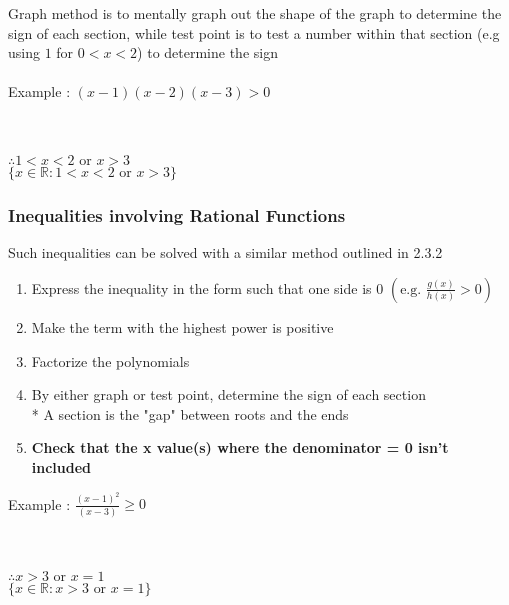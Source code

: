 \documentclass[../main.tex]{subfiles}
\begin{document}
Graph method is to mentally graph out the shape of the graph to
determine the sign of each section, while  test point is to test
a number within that section (e.g using \(1\) for \(0<x<2\)) to
determine the sign \\\\
Example : \((x-1)(x-2)(x-3)>0\) \\\\
 \\
\(\therefore 1<x<2 \text{ or } x>3\) \\
\(\{x \in \mathbb{R} : 1<x<2 \text{ or } x>3\}\)
\newpage \noindent

\subsubsection{Inequalities involving Rational Functions}
Such inequalities can be solved with a similar method outlined in 2.3.2
\begin{enumerate}
    \item Express the inequality in the form such that one side is 0 \(\left(\text{e.g. }\displaystyle \frac{g(x)}{h(x)}>0\right)\)
    \item Make the term with the highest power is positive
    \item Factorize the polynomials
    \item By either graph or test point, determine the sign of each section\\* A section is the "gap" between roots and the ends
    \item \textbf{Check that the  x value(s) where the denominator = 0 isn't included}
\end{enumerate}
Example : \(\displaystyle \frac{(x-1)^{2}}{(x-3)} \geq 0\) \\\\
 \\
\(\therefore x>3 \text{ or } x=1\) \\
\(\{x \in \mathbb{R} : x>3 \text{ or } x=1\}\)
\end{document}
